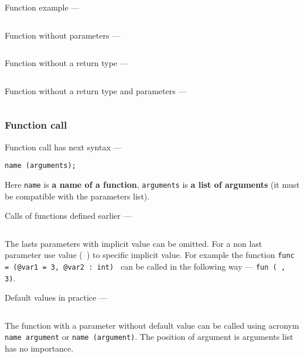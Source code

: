 Function example —
\inputminted[linenos]{icl}{../sources/fullfunc.icL}

Function without parameters —
\inputminted[linenos]{icl}{../sources/noargsfunc.icL}

\newpage
Function without a return type —
\inputminted[linenos]{icl}{../sources/notypefunc.icL}

Function without a return type and parameters —
\inputminted[linenos]{icl}{../sources/minfunc.icL}

\subsubsection{Function call}

Function call has next syntax —
\begin{verbatim}
name (arguments);
\end{verbatim}
Here \texttt{name} is {\bf a name of a function}, \texttt{arguments} is {\bf a list of arguments} (it must be compatible with the parameters list).

Calls of functions defined earlier —
\inputminted[linenos]{icl}{../sources/callfunc.icL}

The lasts parameters with implicit value can be omitted. For a non last parameter use \void{} value (\texttt{~}) to specific implicit value. For example the function \texttt{func = (@var1 = 3, @var2 : int) {}} can be called in the following way — \texttt{fun (~, 3)}.

Default values in practice —
\inputminted[linenos]{icl}{../sources/defaultparametrs.icL}

The function with a parameter without default value can be called using acronym \texttt{name argument} or \texttt{name (argument)}. The position of argument is arguments list has no importance.
